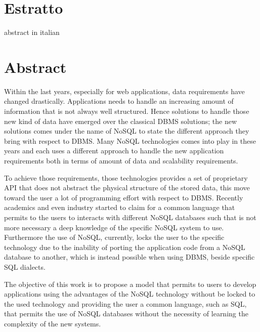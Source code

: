 \thispagestyle{empty}

\chapter*{Estratto}
abstract in italian

\cleardoublepage

\thispagestyle{empty}

\chapter*{Abstract}
Within the last years, especially for web applications, data requirements have changed drastically. Applications needs to handle an increasing amount of information that is not always well structured. Hence solutions to handle those new kind of data have emerged over the classical DBMS solutions; the new solutions comes under the name of NoSQL to state the different approach they bring with respect to DBMS.
Many NoSQL technologies comes into play in these years and each uses a different approach  to handle the new application requirements both in terms of amount of data and scalability requirements.

\noindent To achieve those requirements, those technologies provides a set of proprietary API that does not abstract the physical structure of the stored data, this move toward the user a lot of programming effort with respect to DBMS. Recently academics and even industry started to claim for a common language that permits to the users to interacts with different NoSQL databases such that is not more necessary a deep knowledge of the specific NoSQL system to use. Furthermore the use of NoSQL, currently, locks the user to the specific technology due to the inability of porting the application code from a NoSQL database to another, which is instead possible when using DBMS, beside specific SQL dialects.

\noindent The objective of this work is to propose a model that permits to users to develop applications using the advantages of the NoSQL technology without be locked to the used technology and providing the user a common language, such as SQL, that permits the use of NoSQL databases without the necessity of learning  the complexity of the new systems.

\cleardoublepage
